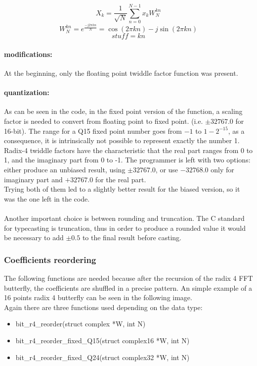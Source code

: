 \documentclass[a4paper]{article}
\begin{document}
\begin{equation}\label{eq:FFT}
X_k = \frac{1}{\sqrt{N}}\sum_{n=0}^{N-1} x_k W_N^{kn}
\end{equation}
$$W_N^{kn} = e^{\frac{-j2\pi kn}{N}} = \cos{(2\pi kn)} - j\sin{(2\pi kn)}$$
$$\mathit{stuff} = kn$$

\paragraph{modifications:}
At the beginning, only the floating point twiddle factor function was present.

\paragraph{quantization:}
As can be seen in the code, in the fixed point version of the function, a scaling factor is needed to convert from floating point to fixed point. (i.e. $\pm32767.0$ for 16-bit).
The range for a Q15 fixed point number goes from $-1$ to $1-2^{-15}$, as a consequence, it is intrinsically not possible to represent exactly the number 1.\\
Radix-4 twiddle factors have the characteristic that the real part ranges from 0 to 1, and the imaginary part from 0 to -1.
The programmer is left with two options: either produce an unbiased result, using $\pm32767.0$, or use $-32768.0$ only for imaginary part and $+32767.0$ for the real part.\\
Trying both of them led to a slightly better result for the biased version, so it was the one left in the code.\\\\
Another important choice is between rounding and truncation. The C standard for typecasting is truncation, thus in order to produce a rounded value it would be necessary to add $\pm0.5$ to the final result before casting.

\subsubsection{Coefficients reordering}
The following functions are needed because after the recursion of the radix 4 FFT butterfly, the coefficients are shuffled in a precise pattern. An simple example of a 16 points radix 4 butterfly can be seen in the following image.\\ 
Again there are three functions used depending on the data type:
\begin{itemize}
	\item bit\_r4\_reorder(struct complex *W, int N)
	\item bit\_r4\_reorder\_fixed\_Q15(struct complex16 *W, int N)
	\item bit\_r4\_reorder\_fixed\_Q24(struct complex32 *W, int N)
\end{itemize}
\end{document}
